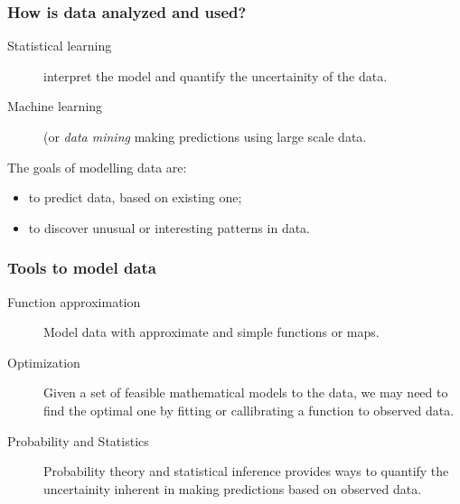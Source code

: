\documentclass{beamer}
\begin{document}
\begin{frame}
\frametitle{How is data analyzed and used?}


\begin{description}
  \item [Statistical learning] interpret the model and quantify the uncertainity of the data.
  \item [Machine learning] (or {\em data mining} making predictions using large scale data.
\end{description}

The goals of modelling data are:
\begin{itemize}
  \item to predict data, based on existing one;
  \item to discover unusual or interesting patterns in data. 
\end{itemize}

\end{frame}


\begin{frame}
\frametitle{Tools to model data}

\begin{description}
  \item [Function approximation] Model data with approximate and simple functions or maps.
  \item [Optimization] Given a set of feasible mathematical models to the data, we may need to find the optimal one by fitting or callibrating a function to observed data.
  \item [Probability and Statistics] Probability theory and statistical inference provides ways to quantify the uncertainity inherent in making predictions based on observed data.
\end{description}
\end{frame}

\end{document}
